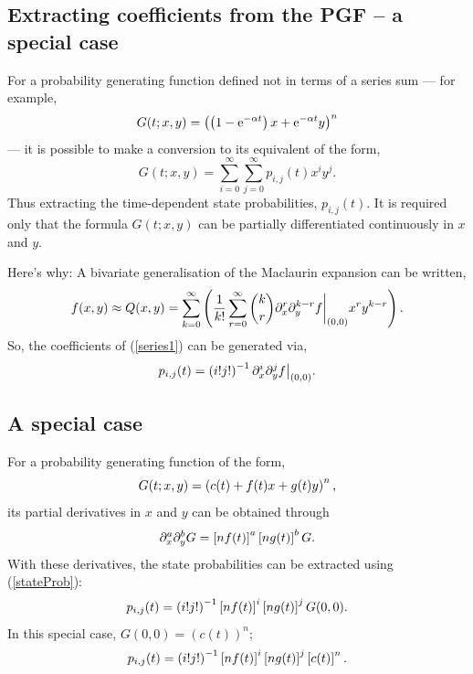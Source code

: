\subsection{Extracting coefficients from the PGF -- a special case}

For a probability generating function defined not in terms of a series sum --- for example, 
\begin{equation}
\label{examplePgf}
G(t;x,y) =  \left(\left(1-{\rm e}^{-\alpha t}\right) x + {\rm e}^{-\alpha t}y\right)^n
\end{equation}
--- it is possible to make a conversion to its equivalent of the form,
\begin{equation}
\label{series1}
G(t;x,y) = \sum^{\infty}_{i=0}\sum^{\infty}_{j=0} p_{i,j}(t)x^iy^j.
\end{equation}
Thus extracting the time-dependent state probabilities, $p_{i,j}(t)$. It is required only that the formula $G(t;x,y)$ can be partially differentiated continuously in $x$ and $y$.\par
Here's why: A bivariate generalisation of the Maclaurin expansion can be written,
$$f(x,y)\approx Q(x,y) = \sum^{\infty}_{k=0} \left(\frac{1}{k!} \sum^{\infty}_{r=0}{k \choose r} \partial_x^r \partial_y^{k-r}f\bigg |_{(0,0)} x^r y^{k-r} \right). $$
So, the coefficients of (\ref{series1}) can be generated via,
\begin{equation}
\label{stateProb}
p_{i,j}(t) = \left( i!j!\right)^{-1} \partial_x^i \partial_y^{j}f\big |_{(0,0)}.
\end{equation}

\subsection*{A special case}


For a probability generating function of the form,
$$G(t;x,y) = \left( c(t) + f(t) x + g(t) y\right)^n,$$
its partial derivatives in $x$ and $y$ can be obtained through
$$\partial_x^a\partial_y^b G = \left[ nf(t)\right]^a\left[ ng(t)\right]^bG.$$
With these derivatives, the state probabilities can be extracted using (\ref{stateProb}):
\begin{equation}
\label{stateProbSpec}
p_{i,j}(t) = \left( i!j!\right)^{-1} \left[ nf(t)\right]^i\left[ ng(t)\right]^jG(0,0).
\end{equation}
In this special case, $G(0,0) = (c(t))^n;$
\begin{equation}
\label{stateProbSpec2}
p_{i,j}(t) = \left( i!j!\right)^{-1} \left[ nf(t)\right]^i\left[ ng(t)\right]^j\left[ c(t)\right]^n.
\end{equation}
